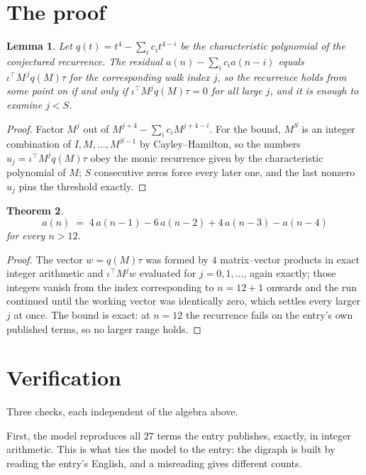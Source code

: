 \documentclass[11pt,a4paper]{article}
\theoremstyle{plain}
\newtheorem{theorem}{Theorem}
\newtheorem{lemma}[theorem]{Lemma}
\theoremstyle{definition}
\begin{document}
\section{The proof}

\begin{lemma}\label{lem:crit}
Let $q(t)=t^{4}-\sum_i c_it^{4-i}$ be the characteristic polynomial of the
conjectured recurrence. The residual $a(n)-\sum_ic_ia(n-i)$ equals
$\iota^{\!\top}M^{\,j}q(M)\tau$ for the corresponding walk index $j$, so the recurrence
holds from some point on if and only if $\iota^{\!\top}M^{j}q(M)\tau=0$ for all large $j$,
and it is enough to examine $j<S$.
\end{lemma}

\begin{proof}
Factor $M^{j}$ out of $M^{j+4}-\sum_ic_iM^{j+4-i}$. For the bound, $M^{S}$
is an integer combination of $I,M,\dots,M^{S-1}$ by Cayley--Hamilton, so the numbers
$u_j=\iota^{\!\top}M^{j}q(M)\tau$ obey the monic recurrence given by the characteristic
polynomial of $M$; $S$ consecutive zeros force every later one, and the last nonzero $u_j$
pins the threshold exactly.
\end{proof}

\begin{theorem}
\[
a(n)\;=\;4\,a(n-1) - 6\,a(n-2) + 4\,a(n-3) - a(n-4)
\]
for every $n>12$.
\end{theorem}

\begin{proof}
The vector $w=q(M)\tau$ was formed by $4$ matrix--vector products in exact integer
arithmetic and $\iota^{\!\top}M^{j}w$ evaluated for $j=0,1,\dots$, again exactly; those
integers vanish from the index corresponding to $n=12+1$ onwards and the run continued
until the working vector was identically zero, which settles every larger $j$ at once. The bound is exact: at $n=12$ the recurrence fails on the entry's own published terms, so no larger range holds.
\end{proof}

\section{Verification}

Three checks, each independent of the algebra above.

First, the model reproduces all $27$ terms the entry publishes, exactly, in integer
arithmetic. This is what ties the model to the entry: the digraph is built by reading the
entry's English, and a misreading gives different counts.
\end{document}
